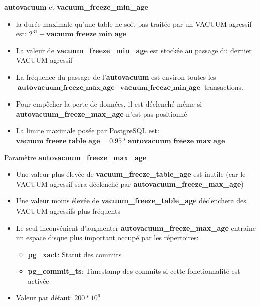 
\begin{frame}{\textbf{autovacuum} et \textbf{vacuum\_freeze\_min\_age}}

\begin{itemize}
   \item la durée maximale qu'une table ne soit pas traitée par un VACUUM agressif est: $2^{31} - \textbf{vacuum\_freeze\_min\_age}$
   \item La valeur de \textbf{vacuum\_freeze\_min\_age} est stockée au passage du dernier VACUUM agressif
   \item La fréquence du passage de l'\textbf{autovacuum} est environ toutes les $\textbf{autovacuum\_freeze\_max\_age} - \textbf{vacuum\_freeze\_min\_age}$ transactions.
   \item Pour empêcher la perte de données, il est déclenché même si \textbf{autovacuum\_freeze\_max\_age} n'est pas positionné
   \item La limite maximale posée par PostgreSQL est: $\textbf{vacuum\_freeze\_table\_age} = 0.95 * \textbf{autovacuum\_freeze\_max\_age}$
\end{itemize}

\end{frame}


\begin{frame}{Paramètre \textbf{autovacuum\_freeze\_max\_age}}

\begin{itemize}
   \item Une valeur plus élevée de \textbf{vacuum\_freeze\_table\_age} est inutile (car le VACUUM agressif sera déclenché par \textbf{autovacuum\_freeze\_max\_age})
   \item Une valeur moins élevée de \textbf{vacuum\_freeze\_table\_age} déclenchera des VACUUM agressifs plus fréquents
   \item Le seul inconvénient d'augmenter \textbf{autovacuum\_freeze\_max\_age} entraîne un espace disque plus important occupé par les répertoires: 
      \begin{itemize}
         \item \textbf{pg\_xact}: Statut des commits
         \item \textbf{pg\_commit\_ts}: Timestamp des commits si cette fonctionnalité est activée
      \end{itemize}
   \item Valeur par défaut: $200*10^{6}$ 
\end{itemize}

\begin{toile}
\end{toile}

\end{frame}

